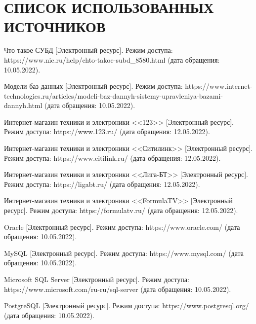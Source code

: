 \section*{СПИСОК ИСПОЛЬЗОВАННЫХ ИСТОЧНИКОВ}

\begingroup
\renewcommand{\section}[2]{}
\begin{thebibliography}{}
	
	Что такое СУБД [Электронный ресурс]. Режим доступа: https://www.nic.ru/help/chto-takoe-subd\_8580.html (дата обращения: 10.05.2022).
	
	Модели баз данных [Электронный ресурс]. Режим доступа: https://www.internet-technologies.ru/articles/modeli-baz-dannyh-sistemy-upravleniya-bazami-dannyh.html (дата обращения: 10.05.2022).
	
	Интернет-магазин техники и электроники <<123>> [Электронный ресурс]. Режим доступа: https://www.123.ru/ (дата обращения: 12.05.2022).
	
	Интернет-магазин техники и электроники <<Ситилинк>> [Электронный ресурс]. Режим доступа: https://www.citilink.ru/ (дата обращения: 12.05.2022).
	
	Интернет-магазин техники и электроники <<Лига-БТ>> [Электронный ресурс]. Режим доступа: https://ligabt.ru/ (дата обращения: 12.05.2022).
	
	Интернет-магазин техники и электроники <<FormulaTV>> [Электронный ресурс]. Режим доступа: https://formulatv.ru/ (дата обращения: 12.05.2022).
	
	Oracle [Электронный ресурс]. Режим доступа: https://www.oracle.com/ (дата обращения: 10.05.2022).
	
	MySQL [Электронный ресурс]. Режим доступа: https://www.mysql.com/ (дата обращения: 10.05.2022).
	
	Microsoft SQL Server [Электронный ресурс]. Режим доступа: https://www.microsoft.com/ru-ru/sql-server (дата обращения: 10.05.2022).
	
	PostgreSQL [Электронный ресурс]. Режим доступа: https://www.postgresql.org/ (дата обращения: 10.05.2022).
	
\end{thebibliography}
\endgroup

\pagebreak
